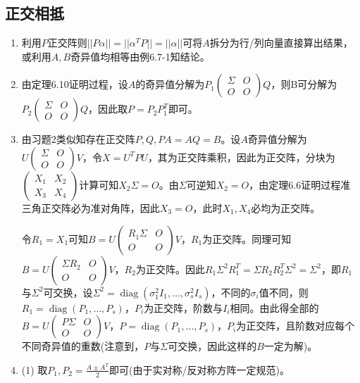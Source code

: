 \documentclass[a4paper,UTF8,fontset=windows]{ctexart}
\DeclareMathOperator{\diag}{diag}
\begin{document}
\subsection{正交相抵}
\begin{enumerate}
\item
利用$P$正交阵则$||P\alpha||=||\alpha^TP||=||\alpha||$可将$A$拆分为行/列向量直接算出结果，或利用$A,B$奇异值均相等由例6.7-1知结论。

\item
由定理6.10证明过程，设$A$的奇异值分解为$P_1\begin{pmatrix}\Sigma&O\\O&O\end{pmatrix}Q$，则B可分解为$P_2\begin{pmatrix}\Sigma&O\\O&O\end{pmatrix}Q$，因此取$P=P_2P_1^T$即可。

\item
由习题2类似知存在正交阵$P,Q,PA=AQ=B$。设$A$奇异值分解为$U\begin{pmatrix}\Sigma&O\\O&O\end{pmatrix}V$，令$X=U^TPU$，其为正交阵乘积，因此为正交阵，分块为$\begin{pmatrix}X_1&X_2\\X_3&X_4\end{pmatrix}$计算可知$X_2\Sigma=O$。由$\Sigma$可逆知$X_2=O$，由定理6.6证明过程准三角正交阵必为准对角阵，因此$X_3=O$，此时$X_1,X_4$必均为正交阵。

令$R_1=X_1$可知$B=U\begin{pmatrix}R_1\Sigma&O\\O&O\end{pmatrix}V$，$R_1$为正交阵。同理可知$B=U\begin{pmatrix}\Sigma R_2&O\\O&O\end{pmatrix}V$，$R_2$为正交阵。因此$R_1\Sigma^2R_1^T=\Sigma R_2R_2^T\Sigma^2=\Sigma^2$，即$R_1$与$\Sigma^2$可交换，设$\Sigma^2=\diag(\sigma_1^2I_1,\dots,\sigma_s^2I_s)$，不同的$\sigma_i$值不同，则$R_1=\diag(P_1,\dots,P_s)$，$P_i$为正交阵，阶数与$I_i$相同。由此得全部的$B=U\begin{pmatrix}P\Sigma&O\\O&O\end{pmatrix}V$，$P=\diag(P_1,\dots,P_s)$，$P_i$为正交阵，且阶数对应每个不同奇异值的重数(注意到，$P$与$\Sigma$可交换，因此这样的$B$一定为解)。

\item
(1) 取$P_1,P_2=\frac{A\pm A^T}{2}$即可(由于实对称/反对称方阵一定规范)。


\end{enumerate}
\end{document}
